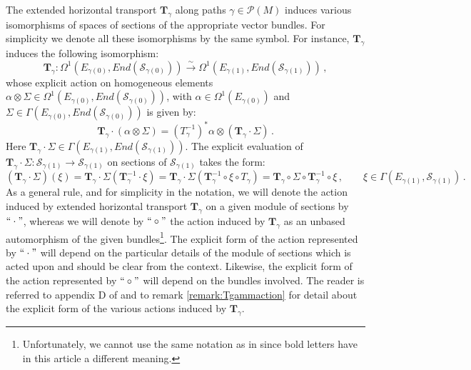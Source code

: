 \documentclass[10pt, cmp, numbook, final, a4paper]{svjour}
\def\cP{\mathcal{P}}
\def\cS{\mathcal{S}}
\def\mT{\mathbf{T}}
\begin{document}
\noindent
The extended horizontal transport $\mT_{\gamma}$ along paths
$\gamma\in \cP(M)$ induces various isomorphisms of spaces of sections
of the appropriate vector bundles. For simplicity we denote all these
isomorphisms by the same symbol. For instance, $\mT_{\gamma}$ induces
the following isomorphism:
\begin{equation*}
\mT_{\gamma}\colon \Omega^{1}(E_{\gamma(0)}, End(\cS_{\gamma(0)}))\xrightarrow{\sim} \Omega^{1}(E_{\gamma(1)}, End(\cS_{\gamma(1)}))\, ,
\end{equation*}
whose explicit action on homogeneous elements $\alpha\otimes \Sigma\in
\Omega^{1}(E_{\gamma(0)}, End(\cS_{\gamma(0)}))$, with $\alpha\in
\Omega^{1}(E_{\gamma(0)})$ and $\Sigma\in \Gamma(E_{\gamma(0)},
End(\cS_{\gamma(0)}))$ is given by:
\begin{equation*}
\mT_{\gamma}\cdot \left( \alpha\otimes \Sigma\right) = (T^{-1}_{\gamma})^{\ast}\alpha \otimes \left( \mT_{\gamma}\cdot \Sigma\right)\, .
\end{equation*}
Here $\mT_{\gamma}\cdot \Sigma\in
\Gamma(E_{\gamma(1)},End(\cS_{\gamma(1)}))$. The explicit
evaluation of $\mT_{\gamma}\cdot \Sigma\colon \cS_{\gamma(1)} \to
\cS_{\gamma(1)}$ on sections of $\cS_{\gamma(1)}$ takes the form:
\begin{equation*}
(\mT_{\gamma}\cdot \Sigma) (\xi) = \mT_{\gamma}\cdot \Sigma (\mT_{\gamma}^{-1}\cdot \xi) = 
\mT_{\gamma}\cdot \Sigma (\mT_{\gamma}^{-1}\circ \xi\circ T_{\gamma}) =  \mT_{\gamma}\circ \Sigma \circ \mT_{\gamma}^{-1}\circ \xi\, , \qquad \xi \in \Gamma(E_{\gamma(1)}, \cS_{\gamma(1)})\, .
\end{equation*}
As a general rule, and for simplicity in the notation, we will denote
the action induced by extended horizontal transport $\mT_{\gamma}$ on
a given module of sections by $``\cdot"$, whereas we will denote by
$``\circ"$ the action induced by $\mT_{\gamma}$ as an unbased
automorphism of the given bundles\footnote{Unfortunately, we cannot
  use the same notation as in \cite{GESM} since bold letters have in
  this article a different meaning.}. The explicit form of the action
represented by $``\cdot"$ will depend on the particular details of the
module of sections which is acted upon and should be clear from
the context. Likewise, the explicit form of the action represented by
$``\circ"$ will depend on the bundles involved. The reader is referred
to appendix D of \cite{GESM} and to remark \ref{remark:Tgammaction}
for detail about the explicit form of the various actions
induced by $\mT_{\gamma}$.
\end{document}
